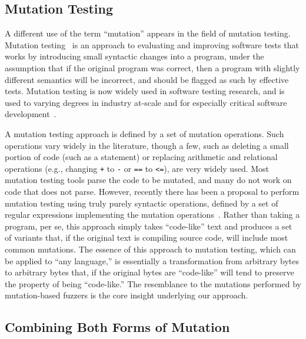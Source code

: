 \subsection{Mutation Testing}

A different use of the term ``mutation'' appears in the field of mutation testing.  Mutation testing~\cite{MutationSurvey,budd1979mutation,demillo1978hints} is an approach to evaluating and improving software tests that works by introducing small syntactic changes into a program, under the assumption that if the original program was correct, then a program with slightly different semantics will be incorrect, and should be flagged as such by effective tests.  Mutation testing is now widely used in software testing research, and is used to varying degrees in industry at-scale and for especially critical software development~\cite{mutKernel,mutGoogle,mutFacebook}.

A mutation testing approach is defined by a set of mutation operations.  Such operations vary widely in the literature, though a few, such as deleting a small portion of code (such as a statement) or replacing arithmetic and relational operations (e.g., changing {\tt +} to {\tt -} or {\tt ==} to {\tt <=}), are very widely used.  Most mutation testing tools parse the code to be mutated, and many do not work on code that does not parse.  However, recently there has been a proposal to perform mutation testing using truly purely syntactic operations, defined by a set of regular expressions implementing the mutation operations~\cite{regexpMut}.  Rather than taking a program, per se, this approach simply takes ``code-like'' text and produces a set of variants that, if the original text is compiling source code, will include most common mutations.  The essence of this approach to mutation testing, which can be applied to ``any language,'' is essentially a transformation from arbitrary bytes to arbitrary bytes that, if the original bytes are ``code-like'' will tend to preserve the property of being ``code-like.''  The resemblance to the mutations performed by mutation-based fuzzers is the core insight underlying our approach.

\subsection{Combining Both Forms of Mutation}

